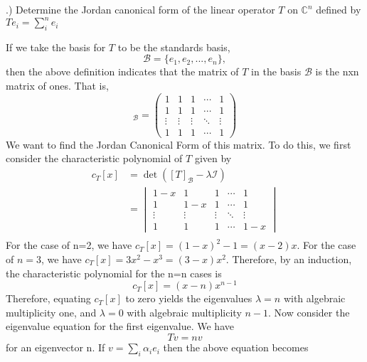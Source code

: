 \documentclass[a4paper, 11pt]{article}
\newcommand{\C}{\mathbb{C}}
\newenvironment{solution}{%
	\begin{list}{}{%
			\setlength{\topsep}{0pt}%
			\setlength{\leftmargin}{1.5cm}%
			\setlength{\rightmargin}{1.5cm}%
			\setlength{\listparindent}{\parindent}%
			\setlength{\itemindent}{\parindent}%
			\setlength{\parsep}{\parskip}%
		}%
		\item[]}{\end{list}}
\begin{document}
.) Determine the Jordan canonical form of the linear operator $T$ on $\C^n$ defined by $Te_i = \sum\limits_i^n e_i$\\
\begin{solution}
  \noindent If we take the basis for $T$ to be the standards basis,
  \begin{equation*}
    \mathcal{B} = \{e_1, e_2, ... , e_n\},
  \end{equation*}
  then the above definition indicates that the matrix of $T$ in the basis $\mathcal{B}$ is the nxn matrix of ones. That is,
  \begin{equation*}
    [T]_\mathcal{B} = \begin{pmatrix}
      1 & 1 & 1 & \cdots & 1 \\
      1 & 1 & 1 & \cdots & 1 \\
      \vdots & \vdots & \vdots & \ddots & \vdots \\
      1 & 1 & 1 & \cdots & 1 
    \end{pmatrix}
  \end{equation*}
  We want to find the Jordan Canonical Form of this matrix. To do this, we first consider the characteristic polynomial of $T$ given by
  \begin{align*}
    c_T[x] &= \det([T]_\mathcal{B}-\lambda\mathcal{I})\\
    &= \begin{vmatrix}
      1-x & 1 & 1 & \cdots & 1 \\
      1 & 1-x & 1 & \cdots & 1 \\
      \vdots & \vdots & \vdots & \ddots & \vdots \\
      1 & 1 & 1 & \cdots & 1-x
      \end{vmatrix}\\
  \end{align*}
  For the case of n=2, we have $c_T[x] = (1-x)^2-1 = (x-2)x$. For the case of $n=3$, we have $c_T[x]= 3x^2-x^3 = (3-x)x^2$. Therefore, by an induction, the characteristic polynomial for the n=n cases is
  \begin{equation*}
    c_T[x] = (x-n)x^{n-1}
  \end{equation*}
  Therefore, equating $c_T[x]$ to zero yields the eigenvalues $\lambda = n$ with algebraic multiplicity one, and $\lambda=0$ with algebraic multiplicity $n-1$. Now consider the eigenvalue equation for the first eigenvalue. We have
  \begin{equation*}
    Tv = nv
  \end{equation*}
  for an eigenvector n. If $v=\sum_i\alpha_ie_i$ then the above equation becomes

\end{solution}
\end{document}
